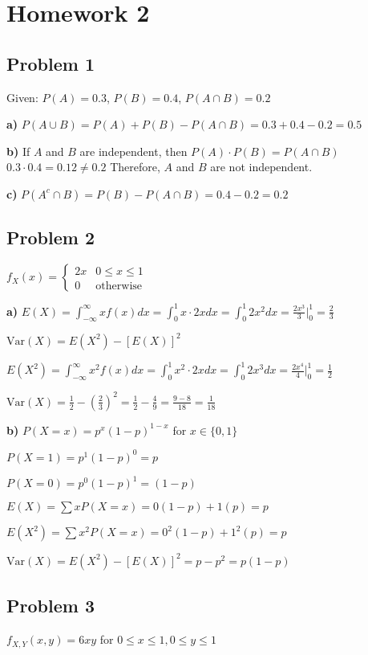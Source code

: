 \documentclass{article}
\begin{document}
\section*{Homework 2}

\subsection*{Problem 1}
Given: $P(A) = 0.3$, $P(B) = 0.4$, $P(A \cap B) = 0.2$

\textbf{a)} $P(A \cup B) = P(A) + P(B) - P(A \cap B) = 0.3 + 0.4 - 0.2 = 0.5$

\textbf{b)} If $A$ and $B$ are independent, then $P(A) \cdot P(B) = P(A \cap B)$
$0.3 \cdot 0.4 = 0.12 \neq 0.2$
Therefore, $A$ and $B$ are not independent.

\textbf{c)} $P(A^c \cap B) = P(B) - P(A \cap B) = 0.4 - 0.2 = 0.2$

\subsection*{Problem 2}
$f_X(x) = \begin{cases} 2x & 0 \leq x \leq 1 \\ 0 & \text{otherwise} \end{cases}$

\textbf{a)} $E(X) = \int_{-\infty}^{\infty} x f(x) dx = \int_0^1 x \cdot 2x dx = \int_0^1 2x^2 dx = \frac{2x^3}{3}\Big|_0^1 = \frac{2}{3}$

$\text{Var}(X) = E(X^2) - [E(X)]^2$

$E(X^2) = \int_{-\infty}^{\infty} x^2 f(x) dx = \int_0^1 x^2 \cdot 2x dx = \int_0^1 2x^3 dx = \frac{2x^4}{4}\Big|_0^1 = \frac{1}{2}$

$\text{Var}(X) = \frac{1}{2} - \left(\frac{2}{3}\right)^2 = \frac{1}{2} - \frac{4}{9} = \frac{9-8}{18} = \frac{1}{18}$

\textbf{b)} $P(X = x) = p^x(1-p)^{1-x}$ for $x \in \{0,1\}$

$P(X = 1) = p^1(1-p)^0 = p$

$P(X = 0) = p^0(1-p)^1 = (1-p)$

$E(X) = \sum x P(X = x) = 0(1-p) + 1(p) = p$

$E(X^2) = \sum x^2 P(X = x) = 0^2(1-p) + 1^2(p) = p$

$\text{Var}(X) = E(X^2) - [E(X)]^2 = p - p^2 = p(1-p)$

\subsection*{Problem 3}
$f_{X,Y}(x,y) = 6xy$ for $0 \leq x \leq 1, 0 \leq y \leq 1$
\end{document}

